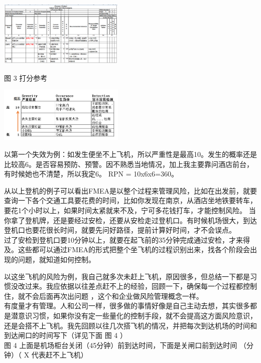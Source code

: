 
\includegraphics[width=6cm]{风险与机会2_FMEA.png}
	
图 3 打分参考


\includegraphics[width=6cm]{风险与机会3_打分参考_1.png}

以第一个失效为例：如发生便坐不上飞机，所以严重性是最高10。发生的概率还是比较高6。是否容易预防、预警。因不熟悉当地情况，加上我主要靠问酒店前台，有时候她也不清楚，所以我定6。
RPN = 10x6x6=360。

从以上登机的例子可以看出FMEA是以整个过程来管理风险，比如在出发前，就要查询一下各个交通工具要花费的时间，比如你发现在南京，从酒店坐地铁要转车，要花1个小时以上，如果时间太紧就来不及，宁可多花钱打车，才能控制风险。
当你拿了登机牌，还是要经过安检，还要从安检走过登机口。有时候机场很大，到达登机口也要花很长时间，就要先问好路径，提前计算好时间，才不会误点。\\
过了安检到登机口要10分钟以上，就要在起飞前的35分钟完成通过安检，才来得及。这些都可以通过FMEA的形式把整个坐飞机的过程识别出来，找各个阶段会出现的问题，就知道如何控制。

以这坐飞机的风险为例，我自己就多次未赶上飞机，原因很多，但总结一下都是习惯没改过来。我应依据以往差点赶不上的经验，回顾一下，确保每一个过程都控制住，就不会后面再次出问题
，这个和企业做风险管理概念一样。\\
有度量才有管理。人和公司一样，很多做的事情好像是自己主动去想，其实很多都是潜意识习惯，如果你没有定一些量化的控制手段，就不会提高这方面风险意识，还是会搭不上飞机。我先回顾以往几次搭飞机的情况，并把每次到达机场的时间和到达闸口的时间写下（详见下面
图 4 ）\\
图 4 上面是机场柜台关闭（45分钟）前到达时间，下面是关闸口前到达时间
（分钟）（ X 代表赶不上飞机）


